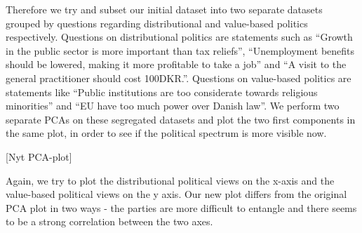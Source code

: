 Therefore we try and subset our initial dataset into two separate datasets grouped by questions regarding distributional and value-based politics respectively. Questions on distributional politics are statements such as “Growth in the public sector is more important than tax reliefs”, “Unemployment benefits should be lowered, making it more profitable to take a job” and “A visit to the general practitioner should cost 100DKR.”. Questions on value-based politics are statements like “Public institutions are too considerate towards religious minorities” and “EU have too much power over Danish law”. We perform two separate PCAs on these segregated datasets and plot the two first components in the same plot, in order to see if the political spectrum is more visible now.

[Nyt PCA-plot]

Again, we try to plot the distributional political views on the x-axis and the value-based political views on the y axis. Our new plot differs from the original PCA plot in two ways - the parties are more difficult to entangle and there seems to be a strong correlation between the two axes. 